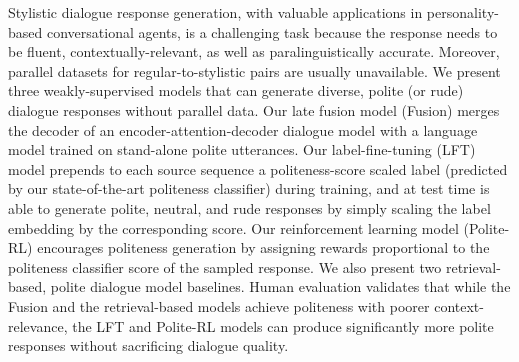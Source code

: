 Stylistic dialogue response generation, with valuable applications in personality-based conversational agents, is a challenging task because the response needs to be fluent, contextually-relevant, as well as paralinguistically accurate. Moreover, parallel datasets for regular-to-stylistic pairs are usually unavailable. We present three weakly-supervised models that can generate diverse, polite (or rude) dialogue responses without parallel data. Our late fusion model (Fusion) merges the decoder of an encoder-attention-decoder dialogue model with a language model trained on stand-alone polite utterances. Our label-fine-tuning (LFT) model prepends to each source sequence a politeness-score scaled label (predicted by our state-of-the-art politeness classifier) during training, and at test time is able to generate polite, neutral, and rude responses by simply scaling the label embedding by the corresponding score. Our reinforcement learning model (Polite-RL) encourages politeness generation by assigning rewards proportional to the politeness classifier score of the sampled response. We also present two retrieval-based, polite dialogue model baselines. Human evaluation validates that while the Fusion and the retrieval-based models achieve politeness with poorer context-relevance, the LFT and Polite-RL models can produce significantly more polite responses without sacrificing dialogue quality.
